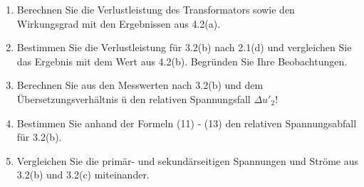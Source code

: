 \begin{enumerate}[label=\alph*)]
	\item Berechnen Sie die Verlustleistung des Transformators sowie den Wirkungsgrad mit
	      den Ergebnissen aus 4.2(a).

	\item Bestimmen Sie die Verlustleistung für 3.2(b) nach 2.1(d) und vergleichen Sie
	      das Ergebnis mit dem Wert aus 4.2(b). Begründen Sie Ihre Beobachtungen.

	\item Berechnen Sie aus den Messwerten nach 3.2(b) und dem Übersetzungsverhältnis ü
	      den relativen Spannungsfall $\Delta u'_2$!

	\item Bestimmen Sie anhand der Formeln (11) - (13) den relativen Spannungsabfall für
	      3.2(b).

	\item Vergleichen Sie die primär- und sekundärseitigen Spannungen und Ströme aus
	      3.2(b) und 3.2(c) miteinander.
\end{enumerate}
